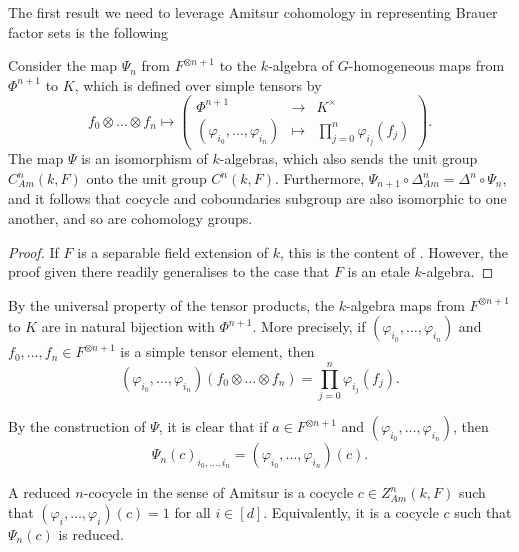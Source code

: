     The first result we need to leverage Amitsur cohomology in representing Brauer factor sets is the following
    \begin{lemma}\label{lemma:AdamsonAmitsur}
        Consider the map \(\Psi_n\) from \(F^{\otimes n+1}\) to the \(k\)-algebra of \(G\)-homogeneous maps from \(\Phi^{n+1}\) to \(K\), which is defined over simple tensors by
        \[f_0 \otimes \hdots \otimes f_n \mapsto \left(\begin{array}{ccl} \Phi^{n+1} &\to &K^\times \\ (\varphi_{i_0},\hdots,\varphi_{i_n}) &\mapsto &\prod_{j=0}^n \varphi_{i_j}(f_j)\end{array}\right).\]
        The map \(\Psi\) is an isomorphism of \(k\)-algebras, which also sends the unit group \(C_{Am}^n(k,F)\) onto the unit group \(C^n(k,F)\). Furthermore, \(\Psi_{n+1} \circ \Delta_{Am}^n = \Delta^n \circ \Psi_{n}\), and it follows that cocycle and coboundaries subgroup are also isomorphic to one another, and so are cohomology groups.
    \end{lemma}

    \begin{proof}
        If \(F\) is a separable field extension of \(k\), this is the content of \cite[Section 2]{rosenberg1960amitsur}. However, the proof given there readily generalises to the case that \(F\) is an etale \(k\)-algebra.
    \end{proof}

    By the universal property of the tensor products, the \(k\)-algebra maps from \(F^{\otimes n+1}\) to \(K\) are in natural bijection with \(\Phi^{n+1}\). More precisely, if \((\varphi_{i_0},\hdots,\varphi_{i_n})\) and \(f_0,\hdots,f_n \in F^{\otimes n+1}\) is a simple tensor element, then
    \[(\varphi_{i_0},\hdots,\varphi_{i_n})(f_0 \otimes \hdots \otimes f_n) = \prod_{j=0}^n \varphi_{i_j}(f_j).\]

    By the construction of \(\Psi\), it is clear that if \(a \in F^{\otimes n+1}\) and \((\varphi_{i_0},\hdots,\varphi_{i_n})\), then
    \begin{equation}\label{eq:AmitsurEmbeddings}
        \Psi_n(c)_{i_0,\hdots,i_n} = (\varphi_{i_0},\hdots,\varphi_{i_n})(c).
    \end{equation}

    \begin{definition}
        A reduced \(n\)-cocycle in the sense of Amitsur is a cocycle \(c \in Z_{Am}^n(k,F)\) such that \((\varphi_i,\hdots,\varphi_i)(c) = 1\) for all \(i \in [d]\). Equivalently, it is a cocycle \(c\) such that \(\Psi_n(c)\) is reduced.
    \end{definition}

